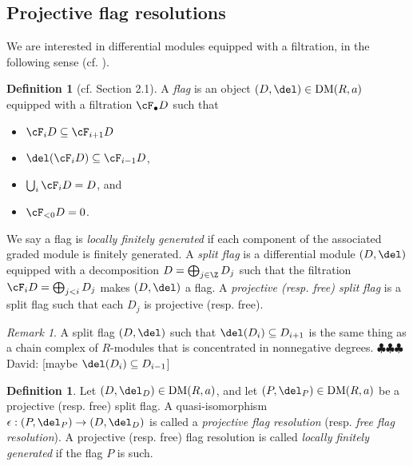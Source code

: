 \documentclass[12pt]{amsart}
\theoremstyle{definition}
\newtheorem{defn}[lemma]{Definition}
\newtheorem{example}[lemma]{Example}
\theoremstyle{remark}
\newtheorem{rem}[lemma]{Remark}
\newcommand{\ZZ}{\mathbb Z}
\newcommand{\david}[1]{{\color{green} \sf $\clubsuit\clubsuit\clubsuit$ David: [#1]}}
\def\DM{\operatorname{DM}}
\begin{document}
\subsection{Projective flag resolutions}

We are interested in differential modules equipped with a filtration, in the following sense (cf. \cite[2.1]{ABI}). 

\begin{defn}[cf. \cite{ABI} Section 2.1]
A \emph{flag} is an object $(D, \del) \in \DM(R, a)$ equipped with a filtration $\cF_\bullet D$ such that 
\begin{itemize}
\item $\cF_i D \subseteq \cF_{i + 1} D$
\item $\del(\cF_i D) \subseteq \cF_{i - 1} D$, 
\item $\bigcup_i \cF_i D = D$, and
\item $\cF_{< 0} D = 0$.
\end{itemize}
We say a flag is \emph{locally finitely generated} if each component of the associated graded module is finitely generated. A \emph{split flag} is a differential module $(D, \del)$ equipped with a decomposition $D = \bigoplus_{j \in \Z} D_j$ such that the filtration $\cF_i D = \bigoplus_{j < i} D_j$ makes $(D, \del)$ a flag. A \emph{projective (resp. free) split flag} is a split flag such that each $D_j$ is projective (resp. free). 
\end{defn}

\iffalse
\begin{example}
Take $R = \ZZ[x]/(x^2)$. 
The complex
$$
0 \to R \xra{x} R(1) \xra{x} \cdots
$$
thought of as a differential module, does not admit a flag. The object $(\ZZ[x]/(x^2), x) \in \DM(R, a)$ admits a flag, but not a split flag.
\end{example}
\fi

\begin{rem}
A split flag $(D, \del)$ such that $\del(D_i) \subseteq D_{i + 1}$ is the same thing as a 
chain complex of $R$-modules that is concentrated in nonnegative degrees.  
\david{maybe $\del(D_i) \subseteq D_{i - 1}$}
\end{rem}

\begin{defn}
Let $(D, \del_D) \in \DM(R, a)$, and let $(P, \del_P) \in \DM(R, a)$ be a projective (resp. free) split flag. A quasi-isomorphism $\epsilon: (P, \del_P) \to (D, \del_D)$ is called a \emph{projective flag resolution} (resp. \emph{free flag resolution}). A projective (resp. free) flag resolution is called \emph{locally finitely generated} if the flag $P$ is such. 
\end{defn}
\end{document}

